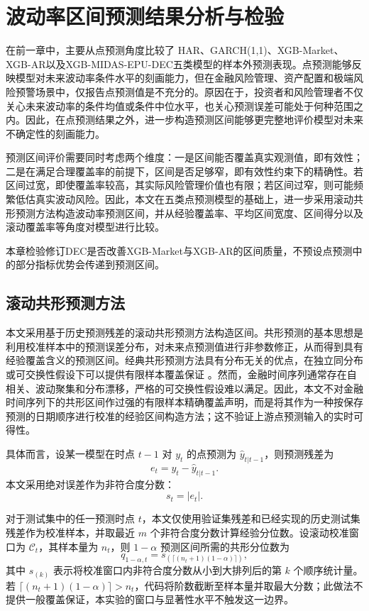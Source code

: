 \section{波动率区间预测结果分析与检验}

在前一章中，主要从点预测角度比较了 HAR、GARCH(1,1)、XGB-Market、XGB-AR以及XGB-MIDAS-EPU-DEC五类模型的样本外预测表现。点预测能够反映模型对未来波动率条件水平的刻画能力，但在金融风险管理、资产配置和极端风险预警场景中，仅报告点预测值是不充分的。原因在于，投资者和风险管理者不仅关心未来波动率的条件均值或条件中位水平，也关心预测误差可能处于何种范围之内。因此，在点预测结果之外，进一步构造预测区间能够更完整地评价模型对未来不确定性的刻画能力。

预测区间评价需要同时考虑两个维度：一是区间能否覆盖真实观测值，即有效性；二是在满足合理覆盖率的前提下，区间是否足够窄，即有效性约束下的精确性。若区间过宽，即使覆盖率较高，其实际风险管理价值也有限；若区间过窄，则可能频繁低估真实波动风险。因此，本文在五类点预测模型的基础上，进一步采用滚动共形预测方法构造波动率预测区间，并从经验覆盖率、平均区间宽度、区间得分以及滚动覆盖率等角度对模型进行比较。

本章检验修订DEC是否改善XGB-Market与XGB-AR的区间质量，不预设点预测中的部分指标优势会传递到预测区间。

\subsection{滚动共形预测方法}

本文采用基于历史预测残差的滚动共形预测方法构造区间。共形预测的基本思想是利用校准样本中的预测误差分布，对未来点预测值进行非参数修正，从而得到具有经验覆盖含义的预测区间。经典共形预测方法具有分布无关的优点，在独立同分布或可交换性假设下可以提供有限样本覆盖保证 \citep{Vovk2005,ShaferVovk2008,Lei2018}。然而，金融时间序列通常存在自相关、波动聚集和分布漂移，严格的可交换性假设难以满足。因此，本文不对金融时间序列下的共形区间作过强的有限样本精确覆盖声明，而是将其作为一种按保存预测的日期顺序进行校准的经验区间构造方法；这不验证上游点预测输入的实时可得性。

具体而言，设某一模型在时点 \(t-1\) 对 \(y_t\) 的点预测为 \(\hat{y}_{t|t-1}\)，则预测残差为
\begin{equation}
	e_t = y_t - \hat{y}_{t|t-1}.
\end{equation}
本文采用绝对误差作为非符合度分数：
\begin{equation}
	s_t = |e_t|.
\end{equation}

对于测试集中的任一预测时点 \(t\)，本文仅使用验证集残差和已经实现的历史测试集残差作为校准样本，并取最近 \(m\) 个非符合度分数计算经验分位数。设滚动校准窗口为 \(\mathcal{C}_t\)，其样本量为 \(n_t\)，则 \(1-\alpha\) 预测区间所需的共形分位数为
\begin{equation}
	q_{1-\alpha,t}
	=
	s_{\left(\lceil (n_t+1)(1-\alpha)\rceil\right)},
\end{equation}
其中 \(s_{(k)}\) 表示将校准窗口内非符合度分数从小到大排列后的第 \(k\) 个顺序统计量。若 \(\lceil (n_t+1)(1-\alpha)\rceil>n_t\)，代码将阶数截断至样本量并取最大分数；此做法不提供一般覆盖保证，本实验的窗口与显著性水平不触发这一边界。

